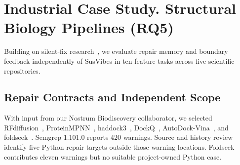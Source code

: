 \section{Industrial Case Study. Structural Biology Pipelines (RQ5)}
\label{sec:practice}
Building on silent-fix research~\cite{colefunda}, we evaluate repair memory and boundary feedback independently of SusVibes in ten feature tasks across five scientific repositories.

\begin{table}[t]
\caption{Independent biology maintenance: two tasks per repository. Rows report final FuncPass/SecPass/JointPass after at most one retry. FuncPass combines ordinary and feature checks. SecPass combines saved and extended checks, including DockQ and AutoDock-Vina reliability contracts. Aggregate counts are out of ten. Bold highlights B3 (Both).}
\label{tab:bio}
\centering\footnotesize

\end{table}

\subsection{Repair Contracts and Independent Scope}
With input from our Nostrum Biodiscovery collaborator, we selected RFdiffusion~\cite{rfdiffusion}, ProteinMPNN~\cite{proteinmpnn}, haddock3~\cite{haddock3}, DockQ~\cite{dockq}, AutoDock-Vina~\cite{vina}, and foldseek~\cite{foldseek}. Semgrep 1.101.0 reports 420 warnings. Source and history review identify five Python repair targets outside those warning locations. Foldseek contributes eleven warnings but no suitable project-owned Python case.

